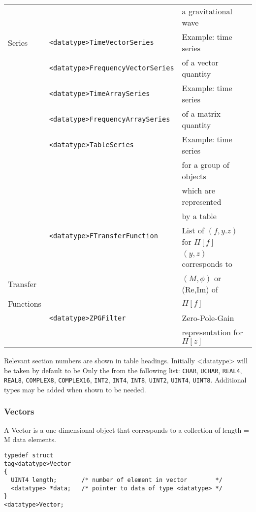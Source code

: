 \documentclass[]{ligodcc}
\renewcommand{\texttt}[1]{{\ttfamily\color{blue}#1}}
\begin{document}
\begin{table}
\begin{center}
\begin{tabular}{|l|l|l|}
           &                                           & a gravitational wave    \\ \cline{2-3}
Series     & {\tt <datatype>TimeVectorSeries}          & Example: time series    \\
           & {\tt <datatype>FrequencyVectorSeries}     & of a vector quantity    \\ \cline{2-3}
           & {\tt <datatype>TimeArraySeries}           & Example: time series    \\
           & {\tt <datatype>FrequencyArraySeries}      & of a matrix quantity    \\ \cline{2-3}
           & {\tt <datatype>TableSeries}               & Example: time series    \\
           &                                           & for a group of objects  \\
           &                                           & which are represented   \\
           &                                           & by a table              \\
\hline
           & {\tt <datatype>FTransferFunction}  & List of $(f,y.z)$ for $H[f]$  \\
           &                                    & $(y,z)$ corresponds to        \\
Transfer   &                                    & $(M,\phi)$ or (Re,Im) of      \\
Functions  &                                    & $H[f]$                        \\ \cline{2-3}
           & {\tt <datatype>ZPGFilter}          & Zero-Pole-Gain                \\
           &                                    & representation for $H[z]$     \\
\hline
\end{tabular}
\end{center}

Relevant section numbers are shown in table
headings. Initially {\texttt {<datatype>}} will be taken by default to be Only
the from the following list: {\tt CHAR}, {\tt UCHAR}, {\tt REAL4},
{\tt REAL8}, {\tt COMPLEX8}, {\tt COMPLEX16}, {\tt INT2}, {\tt INT4}, {\tt INT8},
{\tt UINT2}, {\tt  UINT4}, {\tt UINT8}. Additional types may be added
when shown to be needed.
\label{laldataobjects}
\end{table}


\subsubsection{Vectors}
\label{vectors}
A Vector is a one-dimensional object that corresponds to a collection
of length = M data elements.
{\footnotesize
\begin{verbatim}
typedef struct
tag<datatype>Vector
{
  UINT4 length;       /* number of element in vector        */
  <datatype> *data;   /* pointer to data of type <datatype> */
}
<datatype>Vector;
\end{verbatim}}
\end{document}
